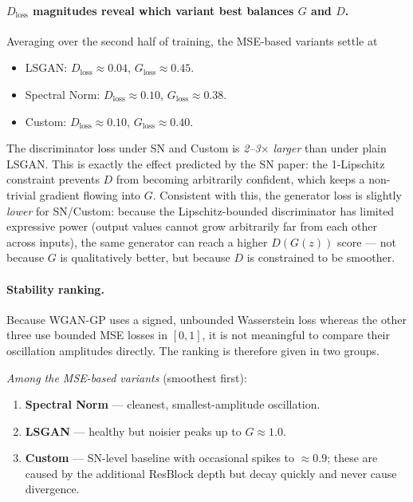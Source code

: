 \documentclass[11pt]{article}
\begin{document}
\paragraph{$D_\text{loss}$ magnitudes reveal which variant best balances
$G$ and $D$.}
Averaging over the second half of training, the MSE-based variants settle at
\begin{itemize}
    \item LSGAN: $D_\text{loss}\approx 0.04$, $G_\text{loss}\approx 0.45$.
    \item Spectral Norm: $D_\text{loss}\approx 0.10$, $G_\text{loss}\approx 0.38$.
    \item Custom: $D_\text{loss}\approx 0.10$, $G_\text{loss}\approx 0.40$.
\end{itemize}
The discriminator loss under SN and Custom is \emph{2–3$\times$ larger} than
under plain LSGAN. This is exactly the effect predicted by the SN paper: the
1-Lipschitz constraint prevents $D$ from becoming arbitrarily confident, which
keeps a non-trivial gradient flowing into $G$. Consistent with this, the
generator loss is slightly \emph{lower} for SN/Custom: because the
Lipschitz-bounded discriminator has limited expressive power (output values
cannot grow arbitrarily far from each other across inputs), the same generator
can reach a higher $D(G(z))$ score — not because $G$ is qualitatively better,
but because $D$ is constrained to be smoother.

\paragraph{Stability ranking.}
Because WGAN-GP uses a signed, unbounded Wasserstein loss whereas the other
three use bounded MSE losses in $[0,1]$, it is not meaningful to compare their
oscillation amplitudes directly. The ranking is therefore given in two
groups.

\smallskip
\noindent\textit{Among the MSE-based variants} (smoothest first):
\begin{enumerate}
    \item \textbf{Spectral Norm} — cleanest, smallest-amplitude oscillation.
    \item \textbf{LSGAN} — healthy but noisier peaks up to $G\!\approx\!1.0$.
    \item \textbf{Custom} — SN-level baseline with occasional spikes to
    $\approx\!0.9$; these are caused by the additional ResBlock depth but
    decay quickly and never cause divergence.
\end{enumerate}
\end{document}
